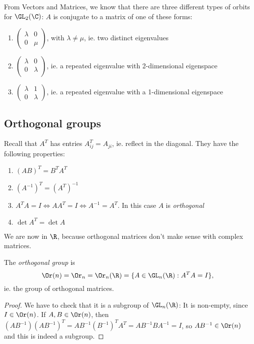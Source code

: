 \documentclass[a4paper]{article}
\begin{document}
From Vectors and Matrices, we know that there are three different types of orbits for $\GL_2(\C)$: $A$ is conjugate to a matrix of one of these forms:
\begin{enumerate}
  \item $
    \begin{pmatrix}
      \lambda & 0\\
      0 & \mu
    \end{pmatrix}
    $, with $\lambda \not= \mu$, ie. two distinct eigenvalues
  \item $
    \begin{pmatrix}
      \lambda & 0\\
      0 & \lambda\\
    \end{pmatrix}$, ie. a repeated eigenvalue with 2-dimensional eigenspace
  \item $
    \begin{pmatrix}
      \lambda & 1\\
      0 & \lambda
    \end{pmatrix}$, ie. a repeated eigenvalue with a 1-dimensional eigenspace
\end{enumerate}
\subsection{Orthogonal groups}
Recall that $A^T$ has entries $A^{T}_{ij} = A_{ji}$, ie. reflect in the diagonal. They have the following properties:
\begin{enumerate}
  \item $(AB)^T = B^TA^T$
  \item $(A^{-1})^T = (A^T)^{-1}$
  \item $A^{T}A = I\Leftrightarrow AA^{T} = I\Leftrightarrow A^{-1} = A^{T}$. In this case $A$ is \emph{orthogonal}
  \item $\det A^{T} = \det A$
\end{enumerate}
\note We are now in $\R$, because orthogonal matrices don't make sense with complex matrices.

\begin{defi}
  The \emph{orthogonal group} is
  \[
    \Or(n) = \Or_n = \Or_n(\R) = \{A\in \GL_n(\R): A^TA = I\},
  \]
  ie. the group of orthogonal matrices.
\end{defi}

\begin{proof}
  We have to check that it is a subgroup of $\GL_n(\R)$: It is non-empty, since $I\in \Or(n)$. If $A, B\in \Or(n)$, then $(AB^{-1})(AB^{-1})^T = AB^{-1}(B^{-1})^TA^{T} = AB^{-1}BA^{-1} = I$, so $AB^{-1}\in \Or(n)$ and this is indeed a subgroup.
\end{proof}
\end{document}
